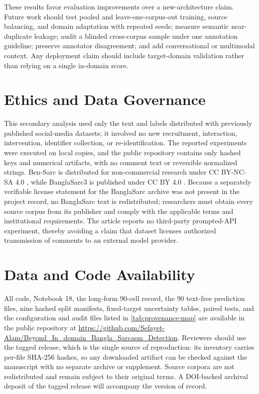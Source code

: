 \documentclass{ieeeaccess}
\begin{document}
These results favor evaluation improvements over a new-architecture claim. Future work should test pooled and leave-one-corpus-out training, source balancing, and domain adaptation with repeated seeds; measure semantic near-duplicate leakage; audit a blinded cross-corpus sample under one annotation guideline; preserve annotator disagreement; and add conversational or multimodal context. Any deployment claim should include target-domain validation rather than relying on a single in-domain score.

\makeatletter
\let\@texttop\relax
\def\@textbottom{\vskip\z@\@plus 1fill}
\makeatother

\section*{Ethics and Data Governance}
This secondary analysis used only the text and labels distributed with previously published social-media datasets; it involved no new recruitment, interaction, intervention, identifier collection, or re-identification. The reported experiments were executed on local copies, and the public repository contains only hashed keys and numerical artifacts, with no comment text or reversible normalized strings. Ben-Sarc is distributed for non-commercial research under CC BY-NC-SA 4.0 \cite{bensarcRepository}, while BanglaSarc3 is published under CC BY 4.0 \cite{banglasarc3Mendeley}. Because a separately verifiable license statement for the BanglaSarc archive was not present in the project record, no BanglaSarc text is redistributed; researchers must obtain every source corpus from its publisher and comply with the applicable terms and institutional requirements. The article reports no third-party prompted-API experiment, thereby avoiding a claim that dataset licenses authorized transmission of comments to an external model provider.

\section*{Data and Code Availability}
All code, Notebook 18, the long-form 90-cell record, the 90 text-free prediction files, nine hashed split manifests, fixed-target uncertainty tables, paired tests, and the configuration and audit files listed in \cref{tab:provenance-map} are available in the public repository at \url{https://github.com/Sefayet-Alam/Beyond_In_domain_Bangla_Sarcasm_Detection}. Reviewers should use the tagged release, which is the single source of reproduction: its  inventory carries per-file SHA-256 hashes, so any downloaded artifact can be checked against the manuscript with no separate archive or supplement. Source corpora are not redistributed and remain subject to their original terms. A DOI-backed archival deposit of the tagged release will accompany the version of record.
\end{document}
